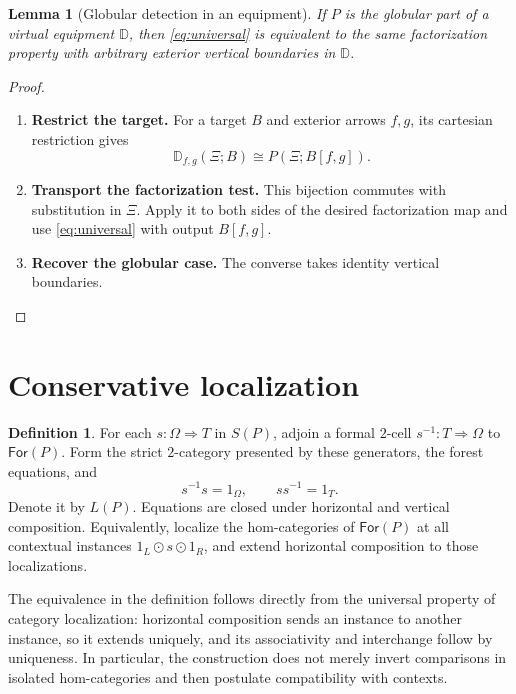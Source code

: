\documentclass[11pt,reqno]{amsart}
\theoremstyle{plain}
\newtheorem{lemma}[theorem]{Lemma}
\theoremstyle{definition}
\newtheorem{definition}[theorem]{Definition}
\theoremstyle{remark}
\numberwithin{equation}{section}
\newcommand{\D}{\mathbb D}
\newcommand{\cell}{\mathrel{\Longrightarrow}}
\newcommand{\Forest}{\mathsf{For}}
\newcommand{\wh}{\mathbin{\odot}}
\begin{document}
\begin{lemma}[Globular detection in an equipment]\label{lem:globdet}
If $P$ is the globular part of a virtual equipment $\D$, then
\cref{eq:universal} is equivalent to the same factorization property with
arbitrary exterior vertical boundaries in $\D$.
\end{lemma}
\begin{proof}\leavevmode
\begin{enumerate}
\item \textbf{Restrict the target.} For a target $B$ and exterior arrows $f,g$, its cartesian restriction gives
\[
 \D_{f,g}(\Xi;B)\cong P(\Xi;B[f,g]).
\]

\item \textbf{Transport the factorization test.} This bijection commutes with substitution in $\Xi$. Apply it to both
sides of the desired factorization map and use
\cref{eq:universal} with output $B[f,g]$.

\item \textbf{Recover the globular case.} The converse takes identity
vertical boundaries.\qedhere
\end{enumerate}
\end{proof}

\section{Conservative localization}\label{sec:localization}

\begin{definition}\label{def:localization}
For each $s:\Omega\cell T$ in $S(P)$, adjoin a formal $2$-cell
$s^{-1}:T\cell\Omega$ to $\Forest(P)$. Form the strict $2$-category
presented by these generators, the forest equations, and
\begin{equation}\label{eq:inverserel}
 s^{-1}s=1_\Omega,\qquad ss^{-1}=1_T.
\end{equation}
Denote it by $L(P)$. Equations are closed under horizontal and vertical
composition. Equivalently, localize the hom-categories of $\Forest(P)$
at all contextual instances $1_L\wh s\wh1_R$, and extend horizontal
composition to those localizations.
\end{definition}

The equivalence in the definition follows directly from the universal
property of category localization: horizontal composition sends an
instance to another instance, so it extends uniquely, and its associativity
and interchange follow by uniqueness. In particular, the construction
does not merely invert comparisons in isolated hom-categories and then
postulate compatibility with contexts.
\end{document}
